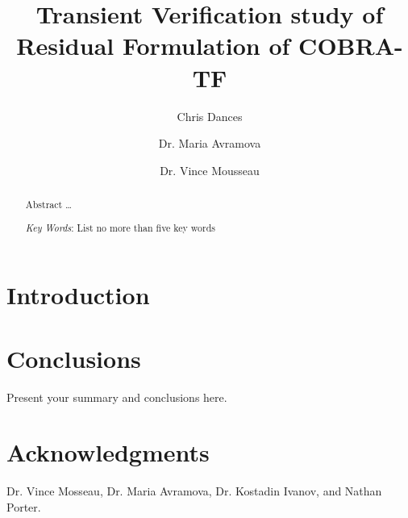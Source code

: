 \documentclass{mc2015}
\begin{document}
\title{Transient Verification study of Residual Formulation of COBRA-TF }

\author{Chris Dances}
\author{Dr. Maria Avramova}

\author{Dr. Vince Mousseau}

\maketitle

\begin{abstract}
Abstract \ldots

\emph{Key Words}: List no more than five key words
\end{abstract}

\section{Introduction}

 \cite{Roy:2005:RCS:1082892.1082899}

\section{Conclusions}

Present your summary and conclusions here.

\section{Acknowledgments}

Dr. Vince Mosseau, Dr. Maria Avramova, Dr. Kostadin Ivanov, and Nathan Porter.

\setlength{\baselineskip}{12pt}





\end{document}
